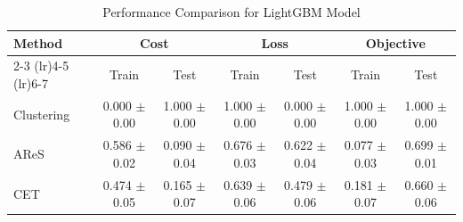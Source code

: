 \begin{table}[htbp]
\centering
\caption{Performance Comparison for LightGBM Model}
\label{tab:compare_x}
\begin{tabular}{lcccccc}
\toprule
Method & \multicolumn{2}{c}{Cost} & \multicolumn{2}{c}{Loss} & \multicolumn{2}{c}{Objective} \\
\cmidrule(lr){2-3} \cmidrule(lr){4-5} \cmidrule(lr){6-7}
 & Train & Test & Train & Test & Train & Test \\
\midrule
Clustering & 0.000 $\pm$ 0.00 & 1.000 $\pm$ 0.00 & 1.000 $\pm$ 0.00 & 0.000 $\pm$ 0.00 & 1.000 $\pm$ 0.00 & 1.000 $\pm$ 0.00 \\
AReS & 0.586 $\pm$ 0.02 & 0.090 $\pm$ 0.04 & 0.676 $\pm$ 0.03 & 0.622 $\pm$ 0.04 & 0.077 $\pm$ 0.03 & 0.699 $\pm$ 0.01 \\
CET & 0.474 $\pm$ 0.05 & 0.165 $\pm$ 0.07 & 0.639 $\pm$ 0.06 & 0.479 $\pm$ 0.06 & 0.181 $\pm$ 0.07 & 0.660 $\pm$ 0.06 \\
\bottomrule
\end{tabular}
\end{table}